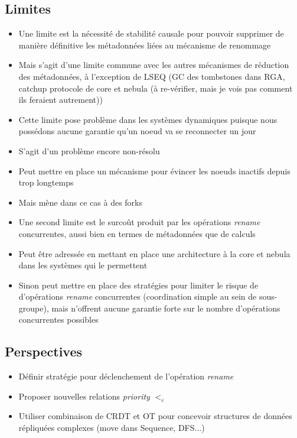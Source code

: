 \documentclass[12pt]{thesul}
\newcommand{\lepoch}{$<_{\varepsilon}$~}
\begin{document}
\subsection{Limites}

\begin{itemize}
  \item Une limite est la nécessité de stabilité causale pour pouvoir supprimer de manière définitive les métadonnées liées au mécanisme de renommage
  \item Mais s'agit d'une limite commune avec les autres mécanismes de réduction des métadonnées, à l'exception de LSEQ (GC des tombstones dans RGA, catchup protocole de core et nebula (à re-vérifier, mais je vois pas comment ils feraient autrement))
  \item Cette limite pose problème dans les systèmes dynamiques puisque nous possédons aucune garantie qu'un noeud va se reconnecter un jour
  \item S'agit d'un problème encore non-résolu
  \item Peut mettre en place un mécanisme pour évincer les noeuds inactifs depuis trop longtemps
  \item Mais mène dans ce cas à des forks
  \item Une second limite est le surcoût produit par les opérations \emph{rename} concurrentes, aussi bien en termes de métadonnées que de calculs
  \item Peut être adressée en mettant en place une architecture à la core et nebula dans les systèmes qui le permettent
  \item Sinon peut mettre en place des stratégies pour limiter le risque de d'opérations \emph{rename} concurrentes (coordination simple au sein de sous-groupe), mais n'offrent aucune garantie forte sur le nombre d'opérations concurrentes possibles
\end{itemize}

\subsection{Perspectives}

\begin{itemize}
  \item Définir stratégie pour déclenchement de l'opération \emph{rename}
  \item Proposer nouvelles relations \emph{priority} \lepoch
  \item Utiliser combinaison de CRDT et OT pour concevoir structures de données répliquées complexes (move dans Sequence, DFS...)
\end{itemize}
\end{document}
